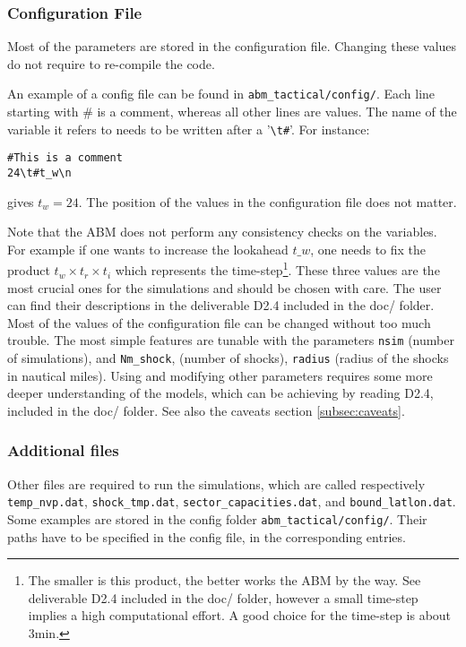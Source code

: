 \documentclass[12pt]{article}
\begin{document}
\subsubsection{Configuration File}
Most of the parameters are stored in the configuration file. Changing these values do not require to re-compile the code. 

An example of a config file can be found in \verb|abm_tactical/config/|. Each line starting with $\#$ is a comment, whereas all other lines are values. The name of the variable it refers to needs to be written after a '\verb|\t#|'. For instance:
\begin{verbatim}
#This is a comment
24\t#t_w\n
\end{verbatim}
gives $t_w = 24$. The position of the values in the configuration file does not matter.

Note that the ABM does not perform any consistency checks on the variables. For example if one wants to increase the lookahead $t\_w$, one needs to fix the product $t_w \times t_r \times t_i$ which represents the time-step\footnote{The smaller is this product, the better works the ABM by the way. See deliverable D2.4 included in the doc/ folder, however a small time-step implies a high computational effort. A good choice for the time-step is about 3min.}. These three values are the most crucial ones for the simulations and should be chosen with care. The user can find their descriptions in the deliverable D2.4 included in the doc/ folder.
\\

Most of the values of the configuration file can be changed without too much trouble. The most simple features are tunable with the parameters \verb|nsim| (number of simulations), and \verb|Nm_shock|, (number of shocks), \verb|radius| (radius of the shocks in nautical miles). Using and modifying other parameters requires some more deeper understanding of the models, which can be achieving by reading D2.4, included in the doc/ folder. See also the caveats section \ref{subsec:caveats}.


\subsubsection{Additional files}
Other files are required to run the simulations, which are called respectively \verb|temp_nvp.dat|, \verb|shock_tmp.dat|,  \verb|sector_capacities.dat|, and \verb|bound_latlon.dat|. Some examples are stored in the config folder \verb|abm_tactical/config/|. Their paths have to be specified in the config file, in the corresponding entries.\\
\end{document}
